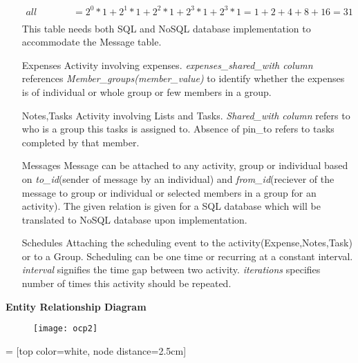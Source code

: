 \documentclass[11]{article}
\numberwithin{equation}{section}
\begin{document}
\begin{enumerate}
\begin{align*}
\textit{all members are involved}&=2^0*1+2^1*1+2^2*1+2^3*1+2^3*1=1+2+4+8+16=31\\
\end{align*}
This table needs both SQL and NoSQL database implementation to accommodate the Message table.
\item[Expenses] Activity involving expenses. \emph{expenses\_shared\_with column} references \emph{Member\_groups(member\_value)} to identify whether the expenses is of individual or whole group or few members in a group.
\item[Notes,Tasks] Activity involving Lists and Tasks. \emph{Shared\_with column} refers to who is a group this tasks is assigned to. Absence of pin\_to refers to tasks completed by that member.
\item[Messages] Message can be attached to any activity, group or individual based on \emph{to\_id}(sender of message by an individual) and \emph{from\_id}(reciever of the message to group or individual or selected members in a group for an activity). The given relation is given for a SQL database which will be translated to NoSQL database upon implementation.
\item[Schedules] Attaching the scheduling event to the activity(Expense,Notes,Task) or to a Group. Scheduling can be one time or recurring at a constant interval. \emph{interval} signifies the time gap between two activity. \emph{iterations} specifies number of times this activity should be repeated.\\
\end{enumerate}
\noindent \textbf{Entity Relationship Diagram} \\
\begin{figure}[h]
     \centering
          \label{ocpic}
                \texttt{[image: ocp2]}
\end{figure}
\iffalse {} = [top color=white, node distance=2.5cm]
\end{document}
